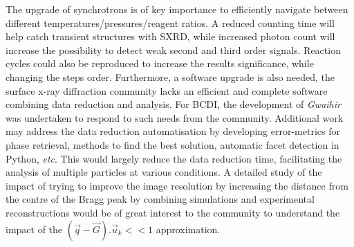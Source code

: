 The upgrade of synchrotrons is of key importance to efficiently navigate between different temperatures/pressures/reagent ratios.
A reduced counting time will help catch transient structures with SXRD, while increased photon count will increase the possibility to detect weak second and third order signals.
Reaction cycles could also be reproduced to increase the results significance, while changing the steps order.
Furthermore, a software upgrade is also needed, the surface x-ray diffraction community lacks an efficient and complete software combining data reduction and analysis.
For BCDI, the development of \textit{Gwaihir} was undertaken to respond to such needs from the community.
Additional work may address the data reduction automatisation by developing error-metrics for phase retrieval, methods to find the best solution, automatic facet detection in Python, \textit{etc}.
This would largely reduce the data reduction time, facilitating the analysis of multiple particles at various conditions.
A detailed study of the impact of trying to improve the image resolution by increasing the distance from the centre of the Bragg peak by combining simulations and experimental reconstructions would be of great interest to the community to understand the impact of the $(\vec{q}-\vec{G}).\vec{u}_k<<1$ approximation.